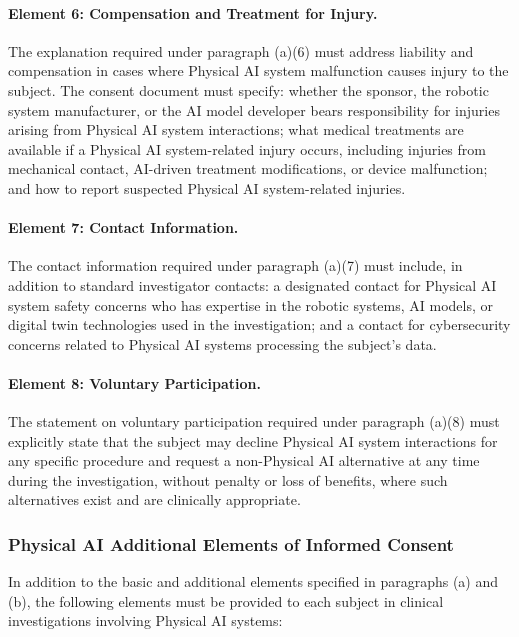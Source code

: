 \documentclass[11pt]{article}
\begin{document}
\paragraph{Element 6: Compensation and Treatment for Injury.} The explanation required under paragraph (a)(6) must address liability and compensation in cases where Physical AI system malfunction causes injury to the subject. The consent document must specify: whether the sponsor, the robotic system manufacturer, or the AI model developer bears responsibility for injuries arising from Physical AI system interactions; what medical treatments are available if a Physical AI system-related injury occurs, including injuries from mechanical contact, AI-driven treatment modifications, or device malfunction; and how to report suspected Physical AI system-related injuries.

\paragraph{Element 7: Contact Information.} The contact information required under paragraph (a)(7) must include, in addition to standard investigator contacts: a designated contact for Physical AI system safety concerns who has expertise in the robotic systems, AI models, or digital twin technologies used in the investigation; and a contact for cybersecurity concerns related to Physical AI systems processing the subject's data.

\paragraph{Element 8: Voluntary Participation.} The statement on voluntary participation required under paragraph (a)(8) must explicitly state that the subject may decline Physical AI system interactions for any specific procedure and request a non-Physical AI alternative at any time during the investigation, without penalty or loss of benefits, where such alternatives exist and are clinically appropriate.

\subsubsection{Physical AI Additional Elements of Informed Consent}

In addition to the basic and additional elements specified in paragraphs (a) and (b), the following elements must be provided to each subject in clinical investigations involving Physical AI systems:
\end{document}

